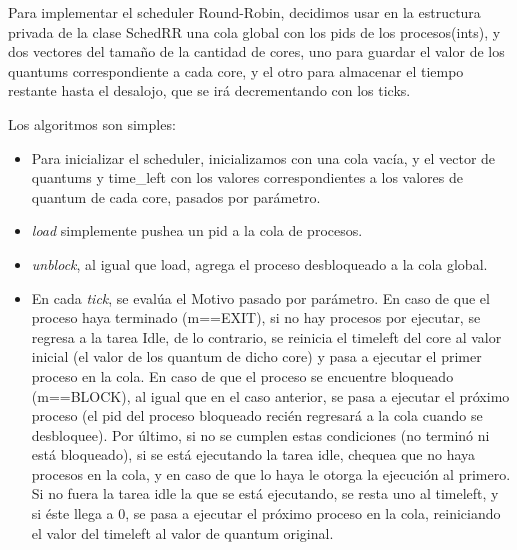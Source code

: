 \par Para implementar el scheduler Round-Robin, decidimos usar en la estructura privada de la clase SchedRR una cola global con los pids de los procesos(ints), y dos vectores del tamaño de la cantidad de cores, uno para guardar el valor de los quantums correspondiente a cada core, y el otro para almacenar el tiempo restante hasta el desalojo, que se irá decrementando con los ticks.

\par Los algoritmos son simples:

\begin{itemize}
\item Para inicializar el scheduler, inicializamos con una cola vacía, y el vector de quantums y time\_left con los valores correspondientes a los valores de quantum de cada core, pasados por parámetro.
\item \emph{load} simplemente pushea un pid a la cola de procesos.
\item \emph{unblock}, al igual que load, agrega el proceso desbloqueado a la cola global.
\item En cada \emph{tick}, se evalúa el Motivo pasado por parámetro. En caso de que el proceso haya terminado (m==EXIT), si no hay procesos por ejecutar, se regresa a la tarea Idle, de lo contrario, se reinicia el timeleft del core al valor inicial (el valor de los quantum de dicho core) y pasa a ejecutar el primer proceso en la cola. En caso de que el proceso se encuentre bloqueado (m==BLOCK), al igual que en el caso anterior, se pasa a ejecutar el próximo proceso (el pid del proceso bloqueado recién regresará a la cola cuando se desbloquee). Por último, si no se cumplen estas condiciones (no terminó ni está bloqueado), si se está ejecutando la tarea idle, chequea que no haya procesos en la cola, y en caso de que lo haya le otorga la ejecución al primero. Si no fuera la tarea idle la que se está ejecutando, se resta uno al timeleft, y si éste llega a 0, se pasa a ejecutar el próximo proceso en la cola, reiniciando el valor del timeleft al valor de quantum original.
\end{itemize}